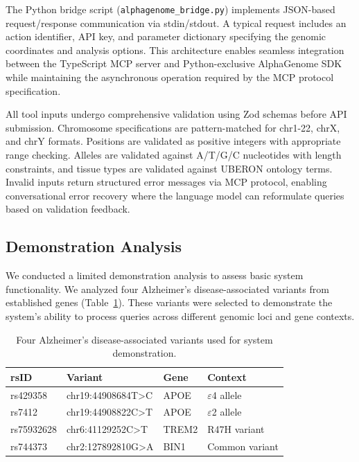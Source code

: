 \documentclass[11pt]{article}
\begin{document}
The Python bridge script (\texttt{alphagenome\_bridge.py}) implements JSON-based request/response communication via stdin/stdout. A typical request includes an action identifier, API key, and parameter dictionary specifying the genomic coordinates and analysis options. This architecture enables seamless integration between the TypeScript MCP server and Python-exclusive AlphaGenome SDK while maintaining the asynchronous operation required by the MCP protocol specification.

All tool inputs undergo comprehensive validation using Zod schemas before API submission. Chromosome specifications are pattern-matched for chr1-22, chrX, and chrY formats. Positions are validated as positive integers with appropriate range checking. Alleles are validated against A/T/G/C nucleotides with length constraints, and tissue types are validated against UBERON ontology terms. Invalid inputs return structured error messages via MCP protocol, enabling conversational error recovery where the language model can reformulate queries based on validation feedback.

\subsection{Demonstration Analysis}

We conducted a limited demonstration analysis to assess basic system functionality. We analyzed four Alzheimer's disease-associated variants from established genes (Table~\ref{tab:variants}). These variants were selected to demonstrate the system's ability to process queries across different genomic loci and gene contexts.

\begin{table}[h]
\centering
\begin{tabular}{llll}
\toprule
\textbf{rsID} & \textbf{Variant} & \textbf{Gene} & \textbf{Context} \\
\midrule
rs429358 & chr19:44908684T>C & APOE & $\varepsilon$4 allele \\
rs7412 & chr19:44908822C>T & APOE & $\varepsilon$2 allele \\
rs75932628 & chr6:41129252C>T & TREM2 & R47H variant \\
rs744373 & chr2:127892810G>A & BIN1 & Common variant \\
\bottomrule
\end{tabular}
\caption{Four Alzheimer's disease-associated variants used for system demonstration.}
\label{tab:variants}
\end{table}
\end{document}
